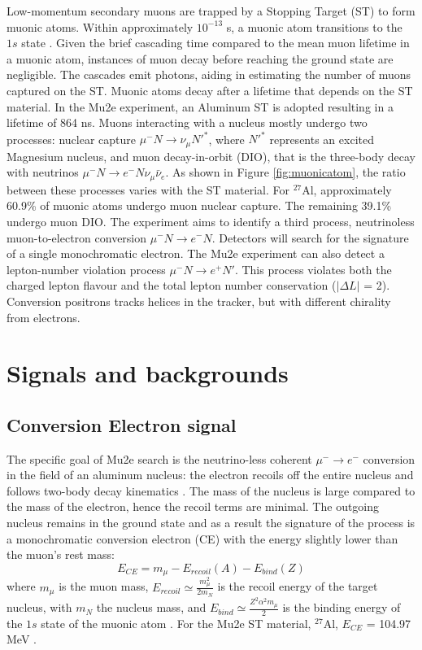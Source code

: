 Low-momentum secondary muons are trapped by a Stopping Target (ST) to form muonic atoms. 
Within approximately $10^{-13}$ s, 
a muonic atom transitions to the $1s$ state \cite{MEASDAY2001243}. 
Given the brief cascading time compared to the mean muon lifetime in a muonic atom,  
instances of muon decay before reaching the ground state are negligible. 
The cascades emit photons, aiding in estimating the number of muons captured 
on the ST. 
Muonic atoms decay after a lifetime that depends on the ST material. 
In the Mu2e experiment, an Aluminum ST is adopted resulting in a lifetime of 
864 ns. Muons interacting with a nucleus mostly undergo two processes: 
nuclear capture $\mu^- N \rightarrow \nu_\mu N'^* $, where $N'^*$ represents an excited 
Magnesium nucleus, and muon decay-in-orbit (DIO), 
that is the three-body decay with neutrinos $\mu ^- N \rightarrow e^- N \nu_\mu \bar{\nu}_e$. 
As shown in Figure \ref{fig:muonicatom}, the ratio between these 
processes varies with the ST material. For $^{27}$Al, approximately 60.9\% 
of muonic atoms undergo muon nuclear capture. The remaining 39.1\% undergo muon DIO. 
The experiment aims to identify a third process, neutrinoless muon-to-electron 
conversion $\mu^- N \rightarrow e^- N $. Detectors will search for the signature of a 
single monochromatic electron.
The Mu2e experiment can also detect a lepton-number violation process 
$\mu^- N \rightarrow e^+ N'$.
This process violates both the charged lepton flavour and the total lepton number 
conservation ($|\Delta L|$ = 2). 
Conversion positrons tracks helices in the tracker, but with different chirality from electrons. 
\section{Signals and backgrounds}\label{sigandbkg}
\subsection{Conversion Electron signal}

The specific goal of Mu2e search is the neutrino-less coherent $\mu^- \rightarrow e^-$
conversion in the field of an aluminum nucleus: the electron recoils off the 
entire nucleus and follows two-body decay kinematics \cite{bartoszek2015mu2e}. The mass of the nucleus is large compared to the 
mass of the electron, hence the recoil terms are minimal. The outgoing nucleus 
remains in the ground state and as a result the signature of the process is a monochromatic conversion electron 
(CE) with the energy slightly lower than the muon's rest mass:
\begin{equation}
    E_{CE} = m_\mu - E_{recoil}(A) - E_{bind}(Z) 
\end{equation}
where $m_\mu$ is the muon mass, $E_{recoil}\simeq \frac{m^2_\mu}{2 m_N}$ is 
the recoil energy of the target nucleus, with $m_N$ the nucleus mass, and 
$E_{bind}\simeq \frac{Z^2 \alpha^2 m_\mu}{2}$ is the binding energy of the 
$1s$ state of the muonic atom \cite{universe9010054}. For the Mu2e 
ST material, $^{27}$Al, $E_{CE}$ = 104.97 MeV \cite{PhysRevD.84.013006}.

